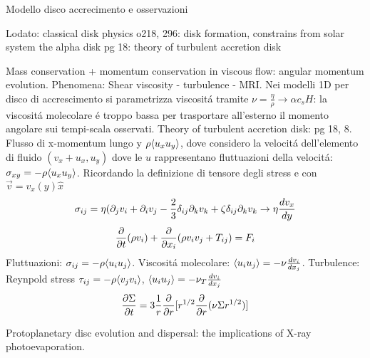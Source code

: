 \begin{reworking}{Modello disco accrecimento e osservazioni}
	\begin{workout}
		Lodato: classical disk physics
		o218, 296: disk formation, constrains from solar system
		the alpha disk pg 18: theory of turbulent accretion disk
	\end{workout}
	
	\begin{workout}
		
	\end{workout}
	
	\begin{workout}
		Mass conservation + momentum conservation in viscous flow: angular momentum evolution. Phenomena: Shear viscosity - turbulence - MRI.
		Nei modelli 1D per disco di accrescimento si parametrizza viscosit\'a tramite $\nu=\frac{\eta}{\rho}\to\alpha c_s H$: la viscosit\'a molecolare \'e troppo bassa  per trasportare all'esterno il momento angolare sui tempi-scala osservati.
		Theory of turbulent accretion disk: pg 18, 8.
		Flusso di x-momentum lungo y $\rho\exv{u_xu_y}$, dove considero la velocit\'a dell'elemento di fluido $(v_x+u_x,u_y)$ dove le $u$ rappresentano fluttuazioni della velocit\'a: $\sigma_{xy}=-\rho\exv{u_xu_y}$.
		Ricordando la definizione di tensore degli stress e con $\vec{v}=v_x(y)\hat{x}$
		\begin{equation}
		\sigma_{ij}=\eta(\partial_jv_i+\partial_iv_j-\frac{2}{3}\delta_{ij}\partial_kv_k+\zeta\delta_{ij}\partial_kv_k \to \eta\TDy{y}{v_x}
		\end{equation}
		\begin{equation}
		\PDof{t}(\rho v_i)+\PDof{x_i}(\rho v_iv_j+T_{ij})=F_i
		\end{equation}
		Fluttuazioni: $\sigma_{ij}=-\rho\exv{u_iu_j}$.
		Viscosit\'a molecolare: $\exv{u_iu_j}=-\nu\TDy{x_j}{v_i}$.
		Turbulence: Reynpold stress $\tau_{ij}=-\rho\exv{v_jv_i}$, $\exv{u_iu_j}=-\nu_T\TDy{x_j}{v_i}$
		\begin{equation}
		\PDy{t}{\Sigma}=3\frac{1}{r}\PDof{r}[r\expy{1/2}\PDof{r}(\nu\Sigma r\expy{1/2})]
		\end{equation}
	\end{workout}
	
	\begin{workout}
		Protoplanetary disc evolution and dispersal: the implications of X-ray photoevaporation.
	\end{workout}
	

\end{reworking}
